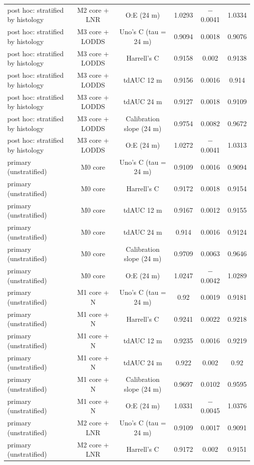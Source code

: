 \begin{table}[htbp]
\begin{tabular*}{\textwidth}{@{\extracolsep{\fill}}lccccc@{}}
post hoc: stratified by histology & M2 core + LNR & O:E (24 m) & 1.0293 & $-$0.0041 & 1.0334 \\
post hoc: stratified by histology & M3 core + LODDS & Uno's C (tau = 24 m) & 0.9094 & 0.0018 & 0.9076 \\
post hoc: stratified by histology & M3 core + LODDS & Harrell's C & 0.9158 & 0.002 & 0.9138 \\
post hoc: stratified by histology & M3 core + LODDS & tdAUC 12 m & 0.9156 & 0.0016 & 0.914 \\
post hoc: stratified by histology & M3 core + LODDS & tdAUC 24 m & 0.9127 & 0.0018 & 0.9109 \\
post hoc: stratified by histology & M3 core + LODDS & Calibration slope (24 m) & 0.9754 & 0.0082 & 0.9672 \\
post hoc: stratified by histology & M3 core + LODDS & O:E (24 m) & 1.0272 & $-$0.0041 & 1.0313 \\
primary (unstratified) & M0 core & Uno's C (tau = 24 m) & 0.9109 & 0.0016 & 0.9094 \\
primary (unstratified) & M0 core & Harrell's C & 0.9172 & 0.0018 & 0.9154 \\
primary (unstratified) & M0 core & tdAUC 12 m & 0.9167 & 0.0012 & 0.9155 \\
primary (unstratified) & M0 core & tdAUC 24 m & 0.914 & 0.0016 & 0.9124 \\
primary (unstratified) & M0 core & Calibration slope (24 m) & 0.9709 & 0.0063 & 0.9646 \\
primary (unstratified) & M0 core & O:E (24 m) & 1.0247 & $-$0.0042 & 1.0289 \\
primary (unstratified) & M1 core + N & Uno's C (tau = 24 m) & 0.92 & 0.0019 & 0.9181 \\
primary (unstratified) & M1 core + N & Harrell's C & 0.9241 & 0.0022 & 0.9218 \\
primary (unstratified) & M1 core + N & tdAUC 12 m & 0.9235 & 0.0016 & 0.9219 \\
primary (unstratified) & M1 core + N & tdAUC 24 m & 0.922 & 0.002 & 0.92 \\
primary (unstratified) & M1 core + N & Calibration slope (24 m) & 0.9697 & 0.0102 & 0.9595 \\
primary (unstratified) & M1 core + N & O:E (24 m) & 1.0331 & $-$0.0045 & 1.0376 \\
primary (unstratified) & M2 core + LNR & Uno's C (tau = 24 m) & 0.9109 & 0.0017 & 0.9091 \\
primary (unstratified) & M2 core + LNR & Harrell's C & 0.9172 & 0.002 & 0.9151 \\

\end{tabular*}
\end{table}
